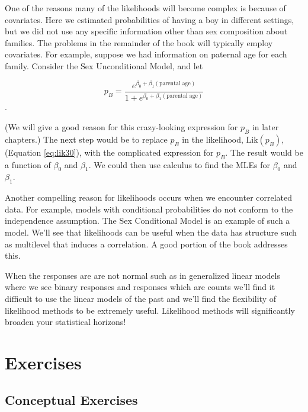 \documentclass[
]{krantz}
\newcommand{\Lik}{\mathrm{Lik}}
\begin{document}
One of the reasons many of the likelihoods will become complex is because of covariates. Here we estimated probabilities of having a boy in different settings, but we did not use any specific information other than sex composition about families. The problems in the remainder of the book will typically employ covariates. For example, suppose we had information on paternal age for each family. Consider the Sex Unconditional Model, and let

\[
p_B= \frac{e^{\beta_0+\beta_1(\textrm{parental age})}}
{1+e^{\beta_0+\beta_1(\textrm{parental age})}}
\].

(We will give a good reason for this crazy-looking expression for \(p_B\) in later chapters.) The next step would be to replace \(p_B\) in the likelihood, \(\Lik(p_B)\), (Equation \eqref{eq:lik30}), with the complicated expression for \(p_B\). The result would be a function of \(\beta_0\) and \(\beta_1\). We could then use calculus to find the MLEs for \(\beta_0\) and \(\beta_1\).

Another compelling reason for likelihoods occurs when we encounter correlated data. For example, models with conditional probabilities do not conform to the independence assumption. The Sex Conditional Model is an example of such a model. We'll see that likelihoods can be useful when the data has structure such as multilevel that induces a correlation. A good portion of the book addresses this.

When the responses are are not normal such as in generalized linear models where we see binary responses and responses which are counts we'll find it difficult to use the linear models of the past and we'll find the flexibility of likelihood methods to be extremely useful. Likelihood methods will significantly broaden your statistical horizons!

\hypertarget{exercises-1}{%
\section{Exercises}\label{exercises-1}}

\hypertarget{conceptual-exercises-1}{%
\subsection{Conceptual Exercises}\label{conceptual-exercises-1}}
\end{document}
